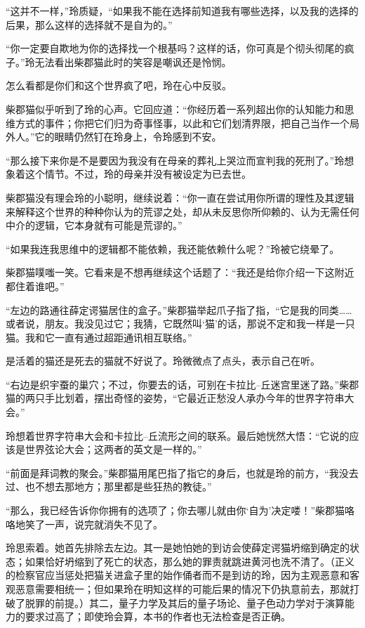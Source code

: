 “这并不一样，”玲质疑，“如果我不能在选择前知道我有哪些选择，以及我的选择的后果，那么这样的选择就不是自为的。”

“你一定要自欺地为你的选择找一个根基吗？这样的话，你可真是个彻头彻尾的疯子。”玲无法看出柴郡猫此时的笑容是嘲讽还是怜悯。

怎么看都是你们和这个世界疯了吧，玲在心中反驳。

柴郡猫似乎听到了玲的心声。它回应道：“你经历着一系列超出你的认知能力和思维方式的事件；你把它们归为奇事怪事，以此和它们划清界限，把自己当作一个局外人。”它的眼睛仍然钉在玲身上，令玲感到不安。

“那么接下来你是不是要因为我没有在母亲的葬礼上哭泣而宣判我的死刑了。”玲想象着这个情节。不过，玲的母亲并没有被设定为已去世。

柴郡猫没有理会玲的小聪明，继续说着：“你一直在尝试用你所谓的理性及其逻辑来解释这个世界的种种你认为的荒谬之处，却从未反思你所仰赖的、认为无需任何中介的逻辑，它本身就有可能是荒谬的。”

“如果我连我思维中的逻辑都不能依赖，我还能依赖什么呢？”玲被它绕晕了。

柴郡猫噗嗤一笑。它看来是不想再继续这个话题了：“我还是给你介绍一下这附近都住着谁吧。”

“左边的路通往薛定谔猫居住的盒子。”柴郡猫举起爪子指了指，“它是我的同类……或者说，朋友。我没见过它；我猜，它既然叫‘猫’的话，那说不定和我一样是一只猫。我和它一直有通过超距通讯相互联络。”

是活着的猫还是死去的猫就不好说了。玲微微点了点头，表示自己在听。

“右边是织宇蚕的巢穴；不过，你要去的话，可别在卡拉比–丘迷宫里迷了路。”柴郡猫的两只手比划着，摆出奇怪的姿势，“它最近正愁没人承办今年的世界字符串大会。”

玲想着世界字符串大会和卡拉比–丘流形之间的联系。最后她恍然大悟：“它说的应该是世界弦论大会；这两者的英文是一样的。”

“前面是拜词教的聚会。”柴郡猫用尾巴指了指它的身后，也就是玲的前方，“我没去过、也不想去那地方；那里都是些狂热的教徒。”

“那么，我已经告诉你你拥有的选项了；你去哪儿就由你‘自为’决定喽！”柴郡猫咯咯地笑了一声，说完就消失不见了。

玲思索着。她首先排除去左边。其一是她怕她的到访会使薛定谔猫坍缩到确定的状态；如果恰好坍缩到了死亡的状态，那么她的罪责就跳进黄河也洗不清了。（正义的检察官应当惩处把猫关进盒子里的始作俑者而不是到访的玲，因为主观恶意和客观恶意需要相统一；但如果玲在明知这样的可能后果的情况下仍执意前去，那就打破了脱罪的前提。）其二，量子力学及其后的量子场论、量子色动力学对于演算能力的要求过高了；即使玲会算，本书的作者也无法检查是否正确。

